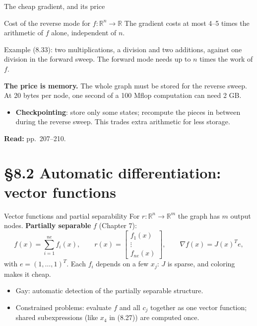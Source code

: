 \documentclass[12pt,aspectratio=169]{beamer}
\newcommand{\readpp}[1]{{\color{red!80!black}\textbf{Read:} #1}}
\newcommand{\R}{\mathbb{R}}
\begin{document}
\begin{frame}{The cheap gradient, and its price}
  \begin{block}{Cost of the reverse mode for $f:\R^n\to\R$}
    The gradient costs \alert{at most 4--5 times} the arithmetic of $f$ alone, \alert{independent of $n$}.
  \end{block}
  Example (8.33): two multiplications, a division and two additions,
  against one division in the forward sweep.
  The forward mode needs up to $n$ times the work of $f$.

  \textbf{The price is memory.} The whole graph must be stored for the reverse sweep.
  At 20 bytes per node, one second of a 100 Mflop computation can need 2 GB.
  \begin{itemize}
    \item \textbf{Checkpointing}: store only some states; recompute the pieces in between during the reverse sweep.
      This trades extra arithmetic for less storage.
  \end{itemize}
  \readpp{pp.~207--210.}
\end{frame}

\section{\S8.2 Automatic differentiation: vector functions}

\begin{frame}{Vector functions and partial separability}
  For $r:\R^n\to\R^m$ the graph has $m$ output nodes.
  \textbf{Partially separable} $f$ (Chapter 7):
  \begin{equation}
    f(x) = \sum_{i=1}^{ne}f_i(x),\qquad
    r(x) = \begin{bmatrix} f_1(x)\\ \vdots\\ f_{ne}(x)\end{bmatrix},\qquad
    \nabla f(x) = J(x)^Te, \tag{8.34, 8.35}
  \end{equation}
  with $e=(1,\dots,1)^T$. Each $f_i$ depends on a few $x_j$: $J$ is sparse, and coloring makes it cheap.
  \begin{itemize}
    \item Gay: automatic detection of the partially separable structure.
    \item Constrained problems: evaluate $f$ and all $c_j$ together as one vector function;
      shared subexpressions (like $x_4$ in (8.27)) are computed once.
  \end{itemize}
\end{frame}
\end{document}
